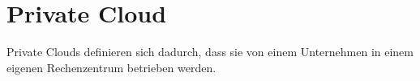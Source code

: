 \documentclass[../main.tex]{subfiles}
\begin{document}




  \section{Private Cloud}
  \label{privateCloud}
    Private Clouds definieren sich dadurch, dass sie von einem Unternehmen in einem eigenen Rechenzentrum betrieben werden.
\end{document}
